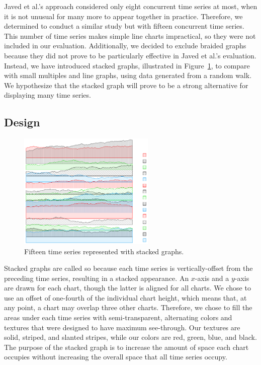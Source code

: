 \documentclass{article}
\begin{document}
Javed et al.'s approach considered only eight concurrent time series at most, when it is not unusual for many more to appear together in practice.  Therefore, we determined to conduct a similar study but with fifteen concurrent time series.  This number of time series makes simple line charts impractical, so they were not included in our evaluation.  Additionally, we decided to exclude braided graphs because they did not prove to be particularly effective in Javed et al.'s evaluation.  Instead, we have introduced stacked graphs, illustrated in Figure~\ref{fig:stackedGraph}, to compare with small multiples and line graphs, using data generated from a random walk.  We hypothesize that the stacked graph will prove to be a strong alternative for displaying many time series.

\subsection{Design}

\begin{figure}[h]
	\centering
	\includegraphics[width=6.5cm]{figures/stacked-new.png}
	\caption{Fifteen time series represented with stacked graphs.}
	\label{fig:stackedGraph}
\end{figure}

Stacked graphs are called so because each time series is vertically-offset from the preceding time series, resulting in a stacked appearance.  An $x$-axis and a $y$-axis are drawn for each chart, though the latter is aligned for all charts.  We chose to use an offset of one-fourth of the individual chart height, which means that, at any point, a chart may overlap three other charts.  Therefore, we chose to fill the areas under each time series with semi-transparent, alternating colors and textures that were designed to have maximum see-through.  Our textures are solid, striped, and slanted stripes, while our colors are red, green, blue, and black. The purpose of the stacked graph is to increase the amount of space each chart occupies without increasing the overall space that all time series occupy.
\end{document}
